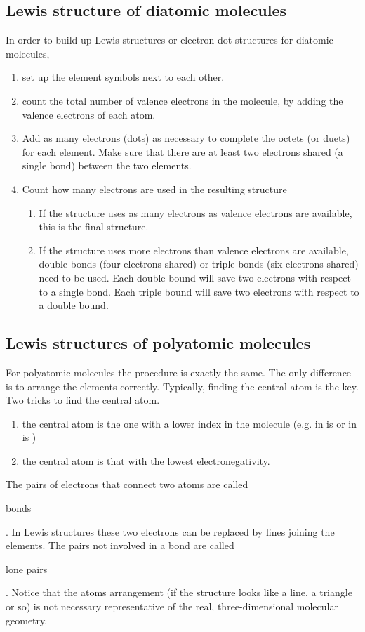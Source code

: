 \documentclass[cover.tex]{subfiles}
\begin{document}
\begin{refsection}
\subsection*{Lewis structure of diatomic molecules}
In order to build up Lewis structures or electron-dot structures for diatomic molecules, 
\begin{enumerate} 
\item set up the element symbols next to each other. 
\item count the total number of valence electrons in the molecule, by adding the valence electrons of each atom. 
\item Add as many electrons (dots) as necessary to complete the octets (or duets) for each element. Make sure that there are at least two electrons shared (a single bond) between the two elements. 
\item Count how many electrons are used in the resulting structure
\begin{enumerate}
\item If the structure uses as many electrons as valence electrons are available, this is the final structure.
\item If the structure uses more electrons than valence electrons are available, double bonds (four electrons shared) or triple bonds (six electrons shared) need to be used. Each double bound will save two electrons with respect to a single bond. Each triple bound will save two electrons with respect to a double bound.
 \end{enumerate}
 \end{enumerate}
 
\subsection*{Lewis structures of polyatomic molecules}
For polyatomic molecules the procedure is exactly the same. The only difference is to arrange the elements correctly. Typically, finding the central atom is the key. Two tricks to find the central atom.
\begin{enumerate}
\item the central atom is the one with a lower index in the molecule (e.g. in  is  or in  is )
\item the central atom is that with the lowest electronegativity.
\end{enumerate}
The pairs of electrons that connect two atoms are called \begin{it}bonds\end{it}. In Lewis structures these two electrons can be replaced by lines joining the elements. The pairs not involved in a bond are called \begin{it}lone pairs\end{it}. Notice that the atoms arrangement (if the structure looks like a line, a triangle or so) is not necessary representative of the real, three-dimensional molecular geometry.
 

\end{refsection}
\end{document}
